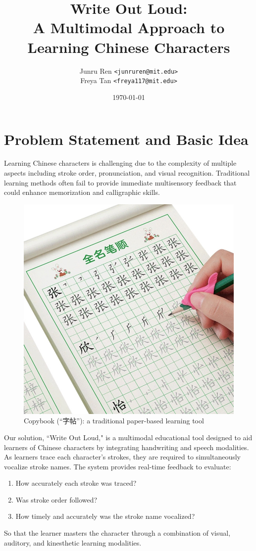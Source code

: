 \documentclass{article}
\title{\textbf{Write Out Loud:\\A Multimodal Approach to Learning Chinese Characters}}
\author{Junru Ren \texttt{<junruren@mit.edu>} \\ Freya Tan \texttt{<freya117@mit.edu>}}
\date{\today}
\begin{document}
\maketitle


\section*{Problem Statement and Basic Idea}
Learning Chinese characters is challenging due to the complexity of multiple aspects including stroke order, pronunciation, and visual recognition. Traditional learning methods often fail to provide immediate multisensory feedback that could enhance memorization and calligraphic skills.

\begin{figure}[h]
    \centering
    \includegraphics[width=0.25\columnwidth]{Assets/traditional_method.jpeg}
    \caption{Copybook (``字帖''): a traditional paper-based learning tool}
\end{figure}

Our solution, ``Write Out Loud," is a multimodal educational tool designed to aid learners of Chinese characters by
integrating handwriting and speech modalities. As learners trace each character's strokes, they are required to
simultaneously vocalize stroke names. The system provides real-time feedback to evaluate:
\begin{enumerate}
    \item How accurately each stroke was traced?
    \item Was stroke order followed?
    \item How timely and accurately was the stroke name vocalized?
\end{enumerate}
So that the learner masters the character through a combination of visual, auditory, and kinesthetic learning
modalities.
\end{document}
